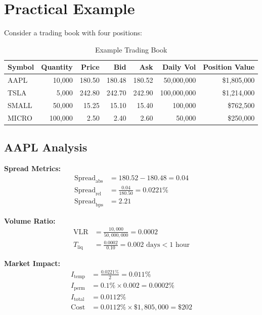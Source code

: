 \documentclass[11pt,a4paper]{article}
\begin{document}
\section{Practical Example}

Consider a trading book with four positions:

\begin{table}[H]
\centering
\caption{Example Trading Book}
\begin{tabular}{@{}lrrrrrr@{}}
\toprule
Symbol & Quantity & Price & Bid & Ask & Daily Vol & Position Value \\
\midrule
AAPL & 10,000 & 180.50 & 180.48 & 180.52 & 50,000,000 & \$1,805,000 \\
TSLA & 5,000 & 242.80 & 242.70 & 242.90 & 100,000,000 & \$1,214,000 \\
SMALL & 50,000 & 15.25 & 15.10 & 15.40 & 100,000 & \$762,500 \\
MICRO & 100,000 & 2.50 & 2.40 & 2.60 & 50,000 & \$250,000 \\
\bottomrule
\end{tabular}
\end{table}

\subsection{AAPL Analysis}

\textbf{Spread Metrics:}
\begin{align*}
\text{Spread}_{\text{abs}} &= 180.52 - 180.48 = 0.04 \\
\text{Spread}_{\text{rel}} &= \frac{0.04}{180.50} = 0.0221\% \\
\text{Spread}_{\text{bps}} &= 2.21
\end{align*}

\textbf{Volume Ratio:}
\begin{align*}
\text{VLR} &= \frac{10,000}{50,000,000} = 0.0002 \\
T_{\text{liq}} &= \frac{0.0002}{0.10} = 0.002 \text{ days} < 1 \text{ hour}
\end{align*}

\textbf{Market Impact:}
\begin{align*}
I_{\text{temp}} &= \frac{0.0221\%}{2} = 0.011\% \\
I_{\text{perm}} &= 0.1\% \times 0.002 = 0.0002\% \\
I_{\text{total}} &= 0.0112\% \\
\text{Cost} &= 0.0112\% \times \$1,805,000 = \$202
\end{align*}
\end{document}
